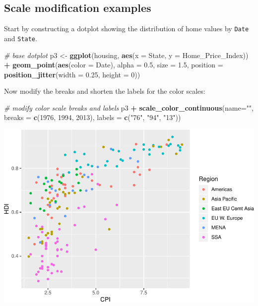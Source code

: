 \documentclass[
]{book}
\newenvironment{Shaded}{\begin{snugshade}}{\end{snugshade}}
\newcommand{\CommentTok}[1]{\textcolor[rgb]{0.56,0.35,0.01}{\textit{#1}}}
\newcommand{\DataTypeTok}[1]{\textcolor[rgb]{0.13,0.29,0.53}{#1}}
\newcommand{\DecValTok}[1]{\textcolor[rgb]{0.00,0.00,0.81}{#1}}
\newcommand{\FloatTok}[1]{\textcolor[rgb]{0.00,0.00,0.81}{#1}}
\newcommand{\KeywordTok}[1]{\textcolor[rgb]{0.13,0.29,0.53}{\textbf{#1}}}
\newcommand{\NormalTok}[1]{#1}
\newcommand{\OperatorTok}[1]{\textcolor[rgb]{0.81,0.36,0.00}{\textbf{#1}}}
\newcommand{\StringTok}[1]{\textcolor[rgb]{0.31,0.60,0.02}{#1}}
\begin{document}
\hypertarget{scale-modification-examples}{%
\subsection{Scale modification examples}\label{scale-modification-examples}}

Start by constructing a dotplot showing the distribution of home values by \texttt{Date} and \texttt{State}.

\begin{Shaded}
\begin{Highlighting}[]
\CommentTok{\# base dotplot}
\NormalTok{p3 \textless{}{-}}\StringTok{ }\KeywordTok{ggplot}\NormalTok{(housing, }\KeywordTok{aes}\NormalTok{(}\DataTypeTok{x =}\NormalTok{ State, }\DataTypeTok{y =}\NormalTok{ Home\_Price\_Index)) }\OperatorTok{+}\StringTok{ }
\StringTok{    }\KeywordTok{geom\_point}\NormalTok{(}\KeywordTok{aes}\NormalTok{(}\DataTypeTok{color =}\NormalTok{ Date), }\DataTypeTok{alpha =} \FloatTok{0.5}\NormalTok{, }\DataTypeTok{size =} \FloatTok{1.5}\NormalTok{,}
               \DataTypeTok{position =} \KeywordTok{position\_jitter}\NormalTok{(}\DataTypeTok{width =} \FloatTok{0.25}\NormalTok{, }\DataTypeTok{height =} \DecValTok{0}\NormalTok{))}
\end{Highlighting}
\end{Shaded}

Now modify the breaks and shorten the labels for the color scales:

\begin{Shaded}
\begin{Highlighting}[]
\CommentTok{\# modify color scale breaks and labels}
\NormalTok{p3 }\OperatorTok{+}\StringTok{ }
\StringTok{  }\KeywordTok{scale\_color\_continuous}\NormalTok{(}\DataTypeTok{name=}\StringTok{""}\NormalTok{,}
                         \DataTypeTok{breaks =} \KeywordTok{c}\NormalTok{(}\DecValTok{1976}\NormalTok{, }\DecValTok{1994}\NormalTok{, }\DecValTok{2013}\NormalTok{),}
                         \DataTypeTok{labels =} \KeywordTok{c}\NormalTok{(}\StringTok{"\textquotesingle{}76"}\NormalTok{, }\StringTok{"\textquotesingle{}94"}\NormalTok{, }\StringTok{"\textquotesingle{}13"}\NormalTok{))}
\end{Highlighting}
\end{Shaded}

\includegraphics{R/Rgraphics/figures/unnamed-chunk-199-1.pdf}
\end{document}
